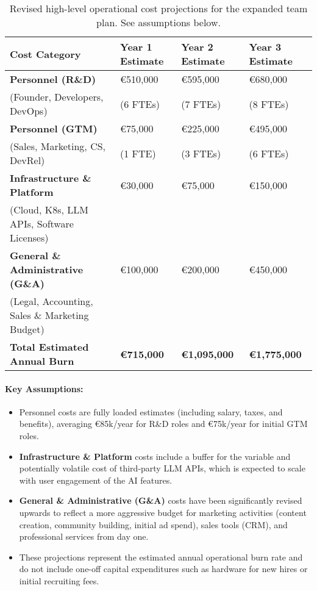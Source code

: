 \begin{table}[H]
\centering
\begin{tabularx}{\textwidth}{L L L L}
\toprule
\textbf{Cost Category} & \textbf{Year 1 Estimate} & \textbf{Year 2 Estimate} & \textbf{Year 3 Estimate} \\
\midrule
\textbf{Personnel (R\&D)} & €510,000 & €595,000 & €680,000 \\
(Founder, Developers, DevOps) & (6 FTEs) & (7 FTEs) & (8 FTEs) \\
\addlinespace
\textbf{Personnel (GTM)} & €75,000 & €225,000 & €495,000 \\
(Sales, Marketing, CS, DevRel) & (1 FTE) & (3 FTEs) & (6 FTEs) \\
\addlinespace
\textbf{Infrastructure \& Platform} & €30,000 & €75,000 & €150,000 \\
(Cloud, K8s, LLM APIs, Software Licenses) & & & \\
\addlinespace
\textbf{General \& Administrative (G\&A)} & €100,000 & €200,000 & €450,000 \\
(Legal, Accounting, Sales \& Marketing Budget) & & & \\
\midrule
\textbf{Total Estimated Annual Burn} & \textbf{€715,000} & \textbf{€1,095,000} & \textbf{€1,775,000} \\
\bottomrule
\end{tabularx}
\caption{Revised high-level operational cost projections for the expanded team plan. See assumptions below.}
\label{tab:cost_projections_expanded_team}
\end{table}

\paragraph*{Key Assumptions:}
\begin{itemize}
    \item Personnel costs are fully loaded estimates (including salary, taxes, and benefits), averaging €85k/year for R\&D roles and €75k/year for initial GTM roles.
    \item \textbf{Infrastructure \& Platform} costs include a buffer for the variable and potentially volatile cost of third-party LLM APIs, which is expected to scale with user engagement of the AI features.
    \item \textbf{General \& Administrative (G\&A)} costs have been significantly revised upwards to reflect a more aggressive budget for marketing activities (content creation, community building, initial ad spend), sales tools (CRM), and professional services from day one.
    \item These projections represent the estimated annual operational burn rate and do not include one-off capital expenditures such as hardware for new hires or initial recruiting fees.
\end{itemize}

